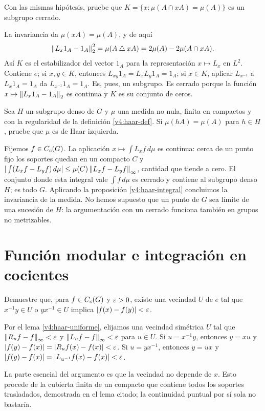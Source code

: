 \begin{ejercicio}\label{ej:v4-l17-3}
Con las mismas hipótesis, pruebe que $K=\{x:\mu(A\cap xA)=\mu(A)\}$ es un subgrupo cerrado.
\end{ejercicio}
\begin{solucion}
La invariancia da $\mu(xA)=\mu(A)$, y de aquí
\[
 \left\lVert L_x1_A-1_A\right\rVert_2^2=\mu(A\mathbin\triangle xA)
       =2\mu(A)-2\mu(A\cap xA).
\]
Así $K$ es el estabilizador del vector $1_A$ para la representación $x\mapsto L_x$ en $L^2$. Contiene $e$; si $x,y\in K$, entonces $L_{xy}1_A=L_xL_y1_A=1_A$; si $x\in K$, aplicar $L_{x^{-1}}$ a $L_x1_A=1_A$ da $L_{x^{-1}}1_A=1_A$. Es, pues, un subgrupo. Es cerrado porque la función $x\mapsto\left\lVert L_x1_A-1_A\right\rVert_2$ es continua y $K$ es su conjunto de ceros.
\end{solucion}

\begin{ejercicio}\label{ej:v4-l17-4}
Sea $H$ un subgrupo denso de $G$ y $\mu$ una medida no nula, finita en compactos y con la regularidad de la definición \ref{v4:haar-def}. Si $\mu(hA)=\mu(A)$ para $h\in H$, pruebe que $\mu$ es de Haar izquierda.
\end{ejercicio}
\begin{solucion}
Fijemos $f\in C_c(G)$. La aplicación $x\mapsto\int L_xf\,d\mu$ es continua: cerca de un punto fijo los soportes quedan en un compacto $C$ y
$|\int(L_xf-L_yf)\,d\mu|\leq\mu(C)\left\lVert L_xf-L_yf\right\rVert_\infty$, cantidad que tiende a cero. El conjunto donde esta integral vale $\int f\,d\mu$ es cerrado y contiene al subgrupo denso $H$; es todo $G$. Aplicando la proposición \ref{v4:haar-integral} concluimos la invariancia de la medida. No hemos supuesto que un punto de $G$ sea límite de una sucesión de $H$: la argumentación con un cerrado funciona también en grupos no metrizables.
\end{solucion}

\chapter{Función modular e integración en cocientes}

\begin{ejercicio}\label{ej:v4-l20-1}
Demuestre que, para $f\in C_c(G)$ y $\varepsilon>0$, existe una vecindad $U$ de $e$ tal que $x^{-1}y\in U$ o $yx^{-1}\in U$ implica $|f(x)-f(y)|<\varepsilon$.
\end{ejercicio}
\begin{solucion}
Por el lema \ref{v4:haar-uniforme}, elijamos una vecindad simétrica $U$ tal que $\left\lVert R_uf-f\right\rVert_\infty<\varepsilon$ y $\left\lVert L_uf-f\right\rVert_\infty<\varepsilon$ para $u\in U$. Si $u=x^{-1}y$, entonces $y=xu$ y
$|f(y)-f(x)|=|R_uf(x)-f(x)|<\varepsilon$. Si $u=yx^{-1}$, entonces $y=ux$ y
$|f(y)-f(x)|=|L_{u^{-1}}f(x)-f(x)|<\varepsilon$.

La parte esencial del argumento es que la vecindad no depende de $x$. Esto procede de la cubierta finita de un compacto que contiene todos los soportes trasladados, demostrada en el lema citado; la continuidad puntual por sí sola no bastaría.
\end{solucion}

